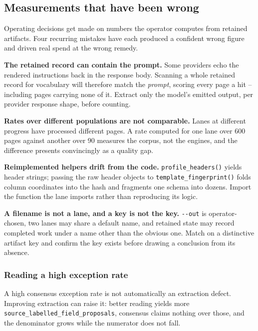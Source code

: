 \documentclass[
]{article}
\newcounter{none} %
\begin{document}
\subsection{Measurements that have been
wrong}\label{measurements-that-have-been-wrong}

Operating decisions get made on numbers the operator computes from
retained artifacts. Four recurring mistakes have each produced a
confident wrong figure and driven real spend at the wrong remedy.

\textbf{The retained record can contain the prompt.} Some providers echo
the rendered instructions back in the response body. Scanning a whole
retained record for vocabulary will therefore match the \emph{prompt},
scoring every page a hit -- including pages carrying none of it. Extract
only the model's emitted output, per provider response shape, before
counting.

\textbf{Rates over different populations are not comparable.} Lanes at
different progress have processed different pages. A rate computed for
one lane over 600 pages against another over 90 measures the corpus, not
the engines, and the difference presents convincingly as a quality gap.

\textbf{Reimplemented helpers drift from the code.}
\texttt{profile\_\allowbreak{}headers()} yields header strings; passing
the raw header objects to \texttt{template\_\allowbreak{}fingerprint()}
folds column coordinates into the hash and fragments one schema into
dozens. Import the function the lane imports rather than reproducing its
logic.

\textbf{A filename is not a lane, and a key is not the key.}
\texttt{-\/-out} is operator-chosen, two lanes may share a default name,
and retained state may record completed work under a name other than the
obvious one. Match on a distinctive artifact key and confirm the key
exists before drawing a conclusion from its absence.

\subsubsection{Reading a high exception
rate}\label{reading-a-high-exception-rate}

A high consensus exception rate is not automatically an extraction
defect. Improving extraction can raise it: better reading yields more
\texttt{source\_\allowbreak{}labelled\_\allowbreak{}field\_\allowbreak{}proposals},
consensus claims nothing over those, and the denominator grows while the
numerator does not fall.
\end{document}
